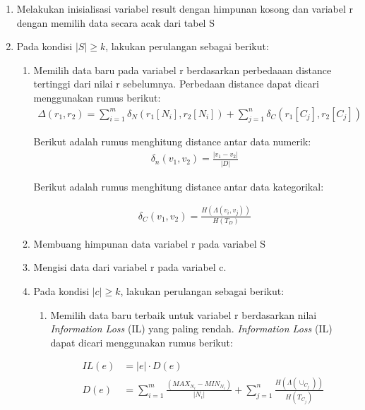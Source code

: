\begin{enumerate}
\item Melakukan inisialisasi variabel result dengan himpunan kosong dan variabel r dengan memilih data secara acak dari tabel S

\item Pada kondisi $|S| \geq k$, lakukan perulangan sebagai berikut:

\begin{enumerate}
\item Memilih data baru pada variabel r berdasarkan perbedaaan distance tertinggi dari nilai r sebelumnya. Perbedaan distance dapat dicari menggunakan rumus berikut:
\begin{align*}
\Delta (r_1,r_2) = \sum_{i=1}^{m} \delta_N(r_1[N_i],r_2	[N_i]) +  \sum_{j=1}^{n} \delta_C(r_1[C_j],r_2[C_j])
\end{align*}

\noindent Berikut adalah rumus menghitung distance antar data numerik:
\begin{align*}
\delta_n(v_1,v_2) = \frac{|v_1 - v_2|}{|D|} 
\end{align*}

\vspace{0.4cm}

\noindent Berikut adalah rumus menghitung distance antar data kategorikal:

\begin{align*}
\delta_C(v_1,v_2) = \frac{H(\Lambda(v_i,v_j))}{H(T_D)} 
\end{align*}

\vspace{0.4cm}

\item Membuang himpunan data variabel r pada variabel S

\item Mengisi data dari variabel r pada variabel c.

\item Pada kondisi $|c| \geq k$, lakukan perulangan sebagai berikut:

\begin{enumerate}
\item Memilih data baru terbaik untuk variabel r berdasarkan nilai \textit{Information Loss} (IL) yang paling rendah. \textit{Information Loss} (IL) dapat dicari menggunakan rumus berikut:

\begin{align*}
IL(e)&= |e| \cdot D(e) \\
D(e) &= \sum_{i=1}^{m} \frac{(MAX_{N_i} - MIN_{N_i})}{|N_i|} + \sum_{j=1}^{n}\frac{H(\Lambda(\cup_{C_j}))}{H(T_{C_j})}
\end{align*}


\end{enumerate}
\end{enumerate}
\end{enumerate}
